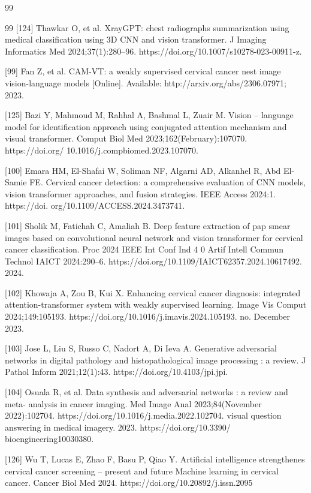 \documentclass{svjour3}
\begin{document}
\begin{thebibliography}{99}
\begin{thebibliography}{99}
[124] Thawkar O, et al. XrayGPT: chest radiographs summarization using medical classification using 3D CNN and vision transformer. J Imaging Informatics Med 2024;37(1):280–96. https://doi.org/10.1007/s10278-023-00911-z.

[99] Fan Z, et al. CAM-VT: a weakly supervised cervical cancer nest image vision-language models [Online]. Available: http://arxiv.org/abs/2306.07971; 2023.

[125] Bazi Y, Mahmoud M, Rahhal A, Bashmal L, Zuair M. Vision – language model for identification approach using conjugated attention mechanism and visual transformer. Comput Biol Med 2023;162(February):107070. https://doi.org/ 10.1016/j.compbiomed.2023.107070.

[100] Emara HM, El-Shafai W, Soliman NF, Algarni AD, Alkanhel R, Abd El-Samie FE. Cervical cancer detection: a comprehensive evaluation of CNN models, vision transformer approaches, and fusion strategies. IEEE Access 2024:1. https://doi. org/10.1109/ACCESS.2024.3473741.

[101] Sholik M, Fatichah C, Amaliah B. Deep feature extraction of pap smear images based on convolutional neural network and vision transformer for cervical cancer classification. Proc 2024 IEEE Int Conf Ind 4 0 Artif Intell Commun Technol IAICT 2024:290–6. https://doi.org/10.1109/IAICT62357.2024.10617492. 2024.

[102] Khowaja A, Zou B, Kui X. Enhancing cervical cancer diagnosis: integrated attention-transformer system with weakly supervised learning. Image Vis Comput 2024;149:105193. https://doi.org/10.1016/j.imavis.2024.105193. no. December 2023.

[103] Jose L, Liu S, Russo C, Nadort A, Di Ieva A. Generative adversarial networks in digital pathology and histopathological image processing : a review. J Pathol Inform 2021;12(1):43. https://doi.org/10.4103/jpi.jpi.

[104] Osuala R, et al. Data synthesis and adversarial networks : a review and meta- analysis in cancer imaging. Med Image Anal 2023;84(November 2022):102704. https://doi.org/10.1016/j.media.2022.102704. visual question answering in medical imagery. 2023. https://doi.org/10.3390/ bioengineering10030380.

[126] Wu T, Lucas E, Zhao F, Basu P, Qiao Y. Artificial intelligence strengthenes cervical cancer screening – present and future Machine learning in cervical cancer. Cancer Biol Med 2024. https://doi.org/10.20892/j.issn.2095


\end{thebibliography}
\end{thebibliography}
\end{document}
